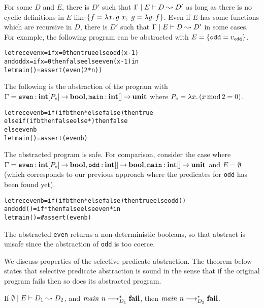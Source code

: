 For some $D$ and $E$, there is $D'$ such that
${\Gamma} \mid {E} \vdash {D} \leadsto {D'}$ as long as there is no cyclic definitions in $E$
like $\{{f = \lambda{x}.\,{{g}~{x}},~ g = \lambda{y}.\,{f}}\}$.
Even if $E$ has some functions which are recursive in $D$,
there is $D'$ such that ${\Gamma} \mid {E} \vdash {D} \leadsto {D'}$ in some cases.
For example, the following program can be abstracted with $E = \{{\mathtt{odd} = v_\mathtt{odd}}\}$.
\begin{alltt}
let rec even x = if x = 0 then true else odd (x-1)
    and odd x = if x = 0 then false else even (x-1) in
let main () = assert (even (2 * n))
\end{alltt}
The following is the abstraction of the program with $\Gamma =
\mathtt{even}\mathbin{:}{\mathbf{int}[P_e]}\mathbin{\rightarrow}{\mathbf{bool}},
\mathtt{main}\mathbin{:}{\mathbf{int}[]}\mathbin{\rightarrow}{\mathbf{unit}}$ where $P_e = \lambda{x}.\,{(x
\mathop{\mathrm{mod}} 2 = 0})$.
\begin{alltt}
let rec even b = if (if b then * else false) then true
                 else if (if b then false else *) then false
                 else even b
let main () = assert (even b)
\end{alltt}
The abstracted program is safe.  For comparison, consider
the case where $\Gamma = \mathtt{even}\mathbin{:}{\mathbf{int}[P_e]}\mathbin{\rightarrow}{\mathbf{bool}},
\mathtt{odd}\mathbin{:}{\mathbf{int}[]}\mathbin{\rightarrow}{\mathbf{bool}},
\mathtt{main}\mathbin{:}{\mathbf{int}[]}\mathbin{\rightarrow}{\mathbf{unit}}$ and $E=\emptyset$ (which
corresponds to our previous approach where the predicates for
\texttt{odd} has been found yet).
\begin{alltt}
let rec even b = if (if b then * else false) then true else odd ()
    and odd () = if * then false else even * in
let main () = # assert (even b)
\end{alltt}
The abstracted \texttt{even} returns a non-deterministic booleans, so
that abstract is unsafe since the abstraction of \texttt{odd} is too
coerce.

We discuss properties of the selective predicate abstraction.
The theorem below states that selective predicate abstraction is sound
in the sense that if the original program fails then so does its
abstracted program.
\begin{theorem}[soundness]
 If ${\emptyset} \mid {E} \vdash {D_1} \leadsto {D_2}$, and
 ${\mathit{main}}~{n} \longrightarrow_{D_1}^* \mathbf{fail}$, then
 ${\mathit{main}}~{n} \longrightarrow_{D_2}^* \mathbf{fail}$.
\end{theorem}


